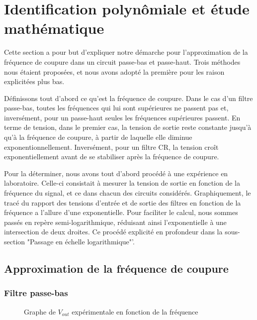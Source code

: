 
\section{Identification polynômiale et étude mathématique}

Cette section a pour but d'expliquer notre démarche pour l'approximation de la fréquence de coupure
dans un circuit passe-bas et passe-haut. Trois méthodes nous étaient proposées, et nous avons adopté 
la première pour les raison explicitées plus bas.

Définissons tout d'abord ce qu'est la fréquence de coupure. Dans le cas d'un filtre passe-bas, toutes les fréquences qui 
lui sont supérieures ne passent pas et, inversément, pour un passe-haut seules les fréquences supérieures passent. 
En terme de tension, dans le premier cas, la tension de sortie reste constante jusqu'à qu'à la fréquence de coupure, 
à partir de laquelle elle diminue exponentionnellement. Inversément, pour un filtre CR, la tension croît 
exponentiellement avant de se stabiliser après la fréquence de coupure.

Pour la déterminer, nous avons tout d'abord procédé à une expérience en laboratoire.
Celle-ci consistait à mesurer la tension de sortie en fonction de la fréquence du signal, et ce dans 
chacun des circuits considérés.
Graphiquement, le tracé du rapport des tensions d'entrée et de sortie des filtres en fonction de la 
fréquence a l'allure d'une exponentielle.  Pour faciliter le calcul, nous sommes passés en repère 
semi-logarithmique, réduisant ainsi l'exponentielle à une intersection de deux droites. Ce procédé
explicité en profondeur dans la sous-section "Passage en échelle logarithmique"'.

\subsection{Approximation de la fréquence de coupure}

\subsubsection{Filtre passe-bas}

\begin{figure}[ht!]
\centering
{}
\caption{Graphe de $V_{out}$ expérimentale en fonction de la fréquence}
\label{lwp_ratio}
\end{figure}


